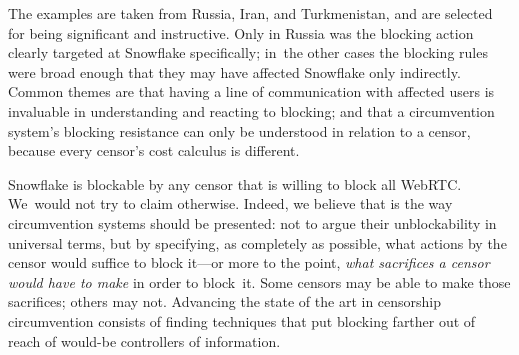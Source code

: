 \documentclass[letterpaper,twocolumn]{article}
\begin{document}
The examples are taken from
Russia, Iran, and Turkmenistan,
and are selected for being significant and instructive.
Only in Russia was the blocking action clearly targeted at Snowflake specifically;
in~the other cases the blocking rules were broad enough
that they may have affected Snowflake only indirectly.
Common themes are that having a line of communication
with affected users is invaluable in understanding and reacting to blocking;
and that a circumvention system's blocking resistance
can only be understood in relation to a censor,
because every censor's cost calculus is different.

Snowflake is blockable by any censor that is willing to block all WebRTC.
We~would not try to claim otherwise.
Indeed, we believe that is the way circumvention systems
should be presented:
not to argue their unblockability in universal terms,
but by specifying, as completely as possible,
what actions by the censor would suffice to block it---or
more to the point,
\emph{what sacrifices a censor would have to make}
in order to block~it.
Some censors may be able to make those sacrifices; others may not.
Advancing the state of the art in censorship circumvention
consists of finding techniques that put blocking
farther out of reach of would-be controllers of information.

\end{document}
